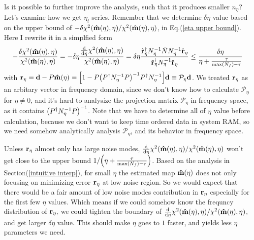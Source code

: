\documentclass[11pt, letterpaper]{article}
\newcommand{\vbd}{\vb{d}}
\newcommand{\inv}[1]{#1^{-1}}
\newcommand{\hatm}{\vb{\hat{m}}}
\newcommand{\Pdagger}{P^{\dagger}}
\newcommand{\Nbar}{\bar{N}}
\newcommand{\PPinv}[1]{\inv{\qty(\Pdagger #1 P)}}
\begin{document}
Is it possible to further improve the analysis, such that it produces
smaller $n_{\eta}$?
Let's examine how we get $\eta_i$ series.
Remember that we determine $\delta\eta$ value based on the upper bound of 
$-\delta\chi^2(\hatm(\eta), \eta)/\chi^2(\hatm(\eta), \eta)$, in
Eq.(\ref{eta upper bound}).
Here I rewrite it in a simplfied form
\begin{align}
-\frac{\delta\chi^2(\hatm(\eta), \eta)}{\chi^2(\hatm(\eta), \eta)}
= -\delta\eta
    \frac{\dv{\eta} \chi^2(\hatm(\eta), \eta)}
    {\chi^2(\hatm(\eta), \eta)}
= \delta\eta \frac{\hat{\vb{r}}_{\eta}^{\dagger} \inv{N}_{\eta} \Nbar 
    \inv{N}_{\eta} \hat{\vb{r}}_{\eta} }
    {\hat{\vb{r}}_{\eta}^{\dagger} \inv{N}_{\eta} \hat{\vb{r}}_{\eta} }
\leq  \frac{\delta \eta}{\eta + \frac{\tau}{\max(N_f) -\tau}}
\end{align}
with
$\vb{r}_{\eta} = \vbd - P\hatm(\eta) 
= \qty[ 1 - P\PPinv{\inv{N_{\eta}}}\Pdagger \inv{N_{\eta}}]\vbd
\equiv \mathcal{P}_{\eta} \vbd$.
We treated $\vb{r}_{\eta}$ as an arbitary 
vector in frequency domain, since we don't know how to calculate 
$\mathcal{P}_{\eta}$ for $\eta \neq 0$, and it's hard to 
analysize the projection matrix $\mathcal{P}_{\eta}$ in frequency space,
as it contains $\PPinv{\inv{N_{\eta}}}$.
Note that we have to determine all of $\eta$ value before calculation, 
because we don't want to keep time ordered data in system RAM,
so we need somehow analytically analysis $\mathcal{P}_{\eta}$, and its behavior
in frequency space.

Unless $\vb{r}_{\eta}$ almost only has large noise modes,
$\dv{\eta}\chi^2(\hatm(\eta),\eta)/\chi^2(\hatm(\eta),\eta)$
won't get close to the upper bound
$1/\qty(\eta + \frac{\tau}{\max(N_f) -\tau})$.
Based on the analysis in Section(\ref{intuitive interp}),
for small $\eta$ the estimated map $\hatm(\eta)$ does not only focusing on 
minimizing error $\vb{r}_{\eta}$ at low noise region.
So we would expect that there would be a fair amount of low noise modes
contribution in $\vb{r}_{\eta}$ especially for the first few $\eta$ values.
Which means if we could somehow know the frequncy distribution of 
$\vb{r}_{\eta}$, we could tighten the boundary of
$\dv{\eta}\chi^2(\hatm(\eta),\eta)/\chi^2(\hatm(\eta),\eta)$,
and get larger $\delta\eta$ value.
This should make $\eta$ goes to $1$ faster, and yields less $\eta$ parameters 
we need.
\end{document}
